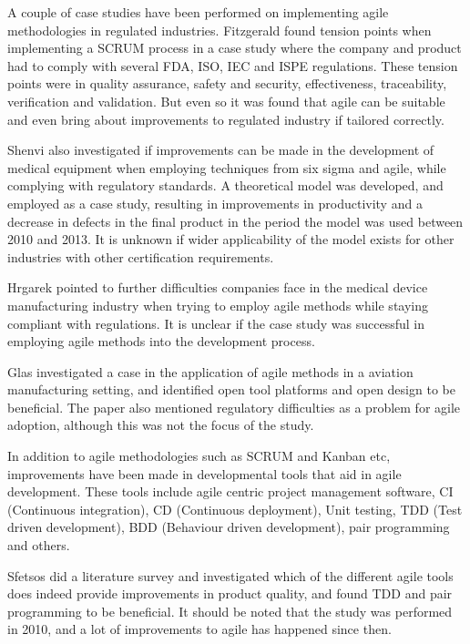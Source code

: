 \documentclass{sig-alternate-05-2015}
\begin{document}
A couple of case studies have been performed on implementing agile methodologies in regulated industries. Fitzgerald \cite{Fitzgerald_2013} found tension points when implementing a SCRUM process in a case study where the company and product had to comply with several FDA, ISO, IEC and ISPE regulations. These tension points were in quality assurance, safety and security, effectiveness, traceability, verification and validation. But even so it was found that agile can be suitable and even bring about improvements to regulated industry if tailored correctly. 

Shenvi \cite{Shenvi_2014} also investigated if improvements can be made in the development of medical equipment when employing techniques from six sigma and agile, while complying with regulatory standards. A theoretical model was developed, and employed as a case study, resulting in improvements in productivity and a decrease in defects in the final product in the period the model was used between 2010 and 2013. It is unknown if wider applicability of the model exists for other industries with other certification requirements. 

Hrgarek \cite{Hrgarek_2012} pointed to further difficulties companies face in the medical device manufacturing industry when trying to employ agile methods while staying compliant with regulations. It is unclear if the case study was successful in employing agile methods into the development process.

Glas \cite{Glas_2009} investigated a case in the application of agile methods in a aviation manufacturing setting, and identified open tool platforms and open design to be beneficial. The paper also mentioned regulatory difficulties as a problem for agile adoption, although this was not the focus of the study. 

In addition to agile methodologies such as SCRUM and Kanban etc, improvements have been made in developmental tools that aid in agile development. These tools include agile centric project management software, CI (Continuous integration), CD (Continuous deployment), Unit testing, TDD (Test driven development), BDD (Behaviour driven development), pair programming and others. 

Sfetsos \cite{Sfetsos_2010} did a literature survey and investigated which of the different agile tools does indeed provide improvements in product quality, and found TDD and pair programming to be beneficial. It should be noted that the study was performed in 2010, and a lot of improvements to agile has happened since then.
\end{document}
